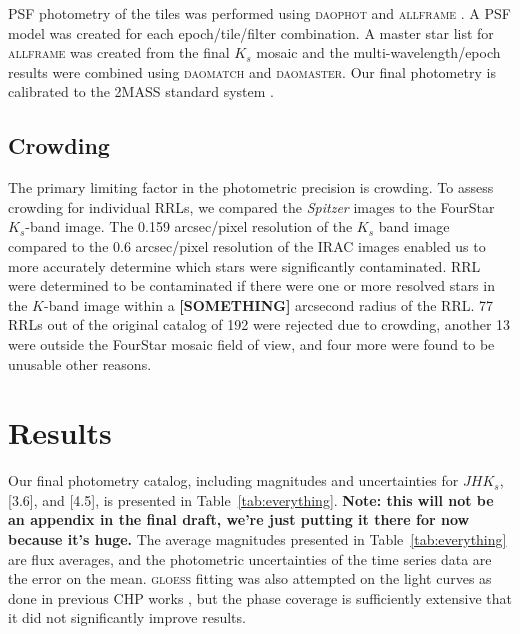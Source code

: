\documentclass[a4paper,fleqn,usenatbib]{mnras}
\begin{document}
PSF photometry of the tiles was performed using \textsc{daophot} and \textsc{allframe} \citep{1987PASP...99..191S, 1994PASP..106..250S}. A PSF model was created for each epoch/tile/filter combination. A master star list for \textsc{allframe} was created from the final $K_s$ mosaic and the multi-wavelength/epoch results were combined using \textsc{daomatch} and \textsc{daomaster}. Our final photometry is calibrated to the 2MASS standard system \citep{2006AJ....131.1163S}. 

\subsection{Crowding}
\label{sec:crowding}


The primary limiting factor in the photometric precision is crowding. To assess crowding for individual RRLs, we compared the {\it Spitzer} images to the FourStar $K_s$-band image. The 0.159 arcsec/pixel resolution of the $K_s$ band image compared to the 0.6 arcsec/pixel resolution of the IRAC images enabled us to more accurately determine which stars were significantly contaminated. RRL were determined to be contaminated if there were one or more resolved stars in the $K$-band image within a {\bf [SOMETHING] }arcsecond radius of the RRL. 77 RRLs out of the original catalog of 192 \citep{2004A&A...424.1101K} were rejected due to crowding, another 13 were outside the FourStar mosaic field of view, and four more were found to be unusable other reasons. %

\section{Results}
\label{sec:results}

Our final photometry catalog, including magnitudes and uncertainties for $J\!H\!K_s$, [3.6], and [4.5], is presented in Table~\ref{tab:everything}. {\bf Note: this will not be an appendix in the final draft, we're just putting it there for now because it's huge.}
The average magnitudes presented in Table~\ref{tab:everything} are flux averages, and the photometric uncertainties of the time series data are the error on the mean. \textsc{gloess} fitting \citet{2004AJ....128.2239P} was also attempted on the light curves as done in previous CHP works \citep[e.g.][]{2011ApJ...743...76S, 2012ApJ...759..146M, 2014ApJ...794..107R, 2016ApJ...816...49S}, but the phase coverage is sufficiently extensive that it did not significantly improve results.
\end{document}
